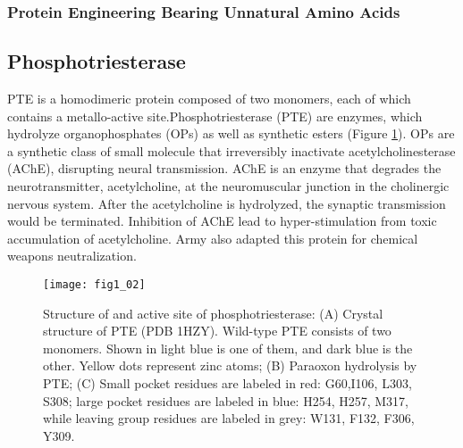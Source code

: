 \begin{refsection}
\begin{figure}[h!]
\end{figure}

\subsubsection{Protein Engineering Bearing Unnatural Amino Acids}

\subsection{Phosphotriesterase} 
\label{sec:pte}

PTE is a homodimeric protein composed of two monomers, each of which contains a
metallo-active site.Phosphotriesterase (PTE) are enzymes, which hydrolyze
organophosphates (OPs) as well as synthetic esters (Figure
\ref{fig:pte-structure})\cite{Ghanem2005a}. OPs are a synthetic class of small
molecule that irreversibly inactivate acetylcholinesterase (AChE), disrupting
neural transmission. AChE is an enzyme that degrades the neurotransmitter,
acetylcholine, at the neuromuscular junction in the cholinergic nervous system.
After the acetylcholine is hydrolyzed, the synaptic transmission would be
terminated. Inhibition of AChE lead to hyper-stimulation from toxic
accumulation of acetylcholine\cite{Soreq2001}. Army also adapted this protein
for chemical weapons neutralization. \cite{Yang2014a}
\begin{figure}[h!] \centering \texttt{[image: fig1\_02]}
    \caption[Structure of and active site of phosphotriesterase: (A) Crystal
    structure of PTE (PDB 1HZY). Wild-type PTE consists of two monomers. Shown
in light blue is one of them, and dark blue is the other. Yellow dots represent
zinc atoms; (B) Paraoxon hydrolysis by PTE; (C) Small pocket residues are
labeled in red: G60,I106, L303, S308; large pocket residues are labeled in
blue: H254, H257, M317, while leaving group residues are labeled in grey: W131,
F132, F306, Y309.] {Structure of and active site of phosphotriesterase: (A)
Crystal structure of PTE (PDB 1HZY). Wild-type PTE consists of two monomers.
Shown in light blue is one of them, and dark blue is the other. Yellow dots
represent zinc atoms; (B) Paraoxon hydrolysis by PTE;  (C) Small pocket
residues are labeled in red: G60,I106, L303, S308; large pocket residues are
labeled in blue: H254, H257, M317, while leaving group residues are labeled in
grey: W131, F132, F306, Y309.}
\label{fig:pte-structure} 
\end{figure} 


\end{refsection}
